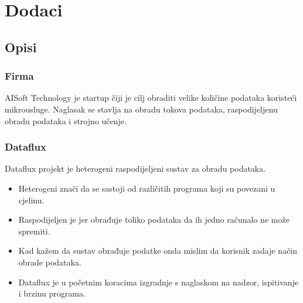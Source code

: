 \documentclass{article}
\begin{document}
\newpage
\section{Dodaci}


\subsection{Opisi}

\subsubsection{Firma}

AISoft Technology je startup čiji je cilj obraditi velike količine podataka koristeći mikrousluge. Naglasak se stavlja na obradu tokova podataka, raspodijeljenu obradu podataka i strojno učenje.

\subsubsection{Dataflux}

Dataflux projekt je heterogeni raspodijeljeni sustav za obradu podataka.

\begin{itemize}
  \item Heterogeni znači da se sastoji od različitih programa koji su povezani u cjelinu.
  \item Raspodijeljen je jer obrađuje toliko podataka da ih jedno računalo ne može spremiti.
  \item Kad kažem da sustav obrađuje podatke onda mislim da korisnik zadaje način obrade podataka.
  \item Dataflux je u početnim koracima izgradnje s naglaskom na nadzor, ispitivanje i brzinu programa.
\end{itemize}
\end{document}
